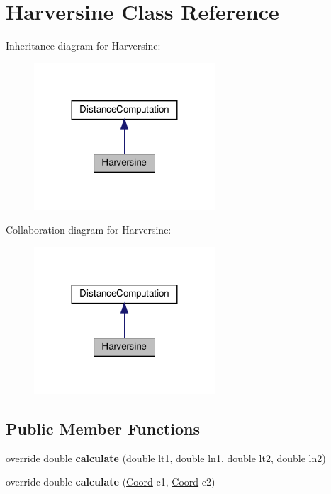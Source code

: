\hypertarget{classHarversine}{}\section{Harversine Class Reference}
\label{classHarversine}


Inheritance diagram for Harversine\+:\nopagebreak
\begin{figure}[H]
\begin{center}
\leavevmode
\includegraphics[width=191pt]{classHarversine__inherit__graph}
\end{center}
\end{figure}


Collaboration diagram for Harversine\+:\nopagebreak
\begin{figure}[H]
\begin{center}
\leavevmode
\includegraphics[width=191pt]{classHarversine__coll__graph}
\end{center}
\end{figure}
\subsection*{Public Member Functions}
\begin{DoxyCompactItemize}
\item 
\mbox{\label{classHarversine_a70b60558e7d5cc7a01e048f2e0165f17}} 
override double {\bfseries calculate} (double lt1, double ln1, double lt2, double ln2)
\item 
\mbox{\label{classHarversine_a4da01c32b8c03a9b329f99e838c368cc}} 
override double {\bfseries calculate} (\hyperlink{structCoord}{Coord} c1, \hyperlink{structCoord}{Coord} c2)
\end{DoxyCompactItemize}
